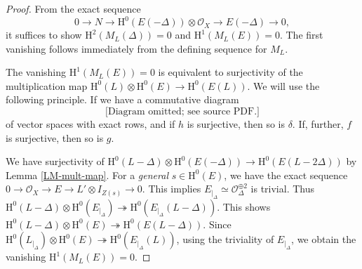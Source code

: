 \begin{proof}
From the exact sequence
$$0 \to N \to \mathrm{H}^0(E(-\Delta)) \otimes \mathcal{O}_X \to E(-\Delta)\to 0,$$
it suffices to show $\mathrm{H}^2(M_L(\Delta))=0$ and $\mathrm{H}^1(M_L(E))=0$. The first vanishing follows immediately from the defining sequence for $M_L$.

The vanishing $\mathrm{H}^1(M_L(E))=0$ is equivalent to surjectivity of the multiplication map $\mathrm{H}^0(L) \otimes \mathrm{H}^0(E) \to \mathrm{H}^0(E(L))$. We will use the following principle. If we have a commutative diagram
{\small{$$\text{[Diagram omitted; see source PDF.]}$$}}
of vector spaces with exact rows, and if $h$ is surjective, then so is $\delta$. If, further, $f$ is surjective, then so is $g$.

We have surjectivity of $\mathrm{H}^0(L-\Delta) \otimes \mathrm{H}^0(E(-\Delta)) \to \mathrm{H}^0(E(L-2\Delta))$ by Lemma \ref{LM-mult-map}.  For a \emph{general} $s \in \mathrm{H}^0(E)$, we have the exact sequence $0 \to \mathcal{O}_X \to E \to L'\otimes I_{Z(s)} \to 0$. This implies $E_{|_{\Delta}} \simeq \mathcal{O}_{\Delta}^{\oplus 2}$ is trivial. Thus $\mathrm{H}^0(L-\Delta) \otimes \mathrm{H}^0(E_{|_{\Delta}}) \twoheadrightarrow \mathrm{H}^0(E_{|_{\Delta}}(L-\Delta))$. This shows $\mathrm{H}^0(L-\Delta) \otimes \mathrm{H}^0(E) \twoheadrightarrow \mathrm{H}^0(E(L-\Delta))$. Since $\mathrm{H}^0(L_{|_{\Delta}}) \otimes \mathrm{H}^0(E) \twoheadrightarrow \mathrm{H}^0(E_{|_{\Delta}}(L))$, using the triviality of $E_{|_{\Delta}}$, we obtain the vanishing $\mathrm{H}^1(M_L(E))=0$.\end{proof}

